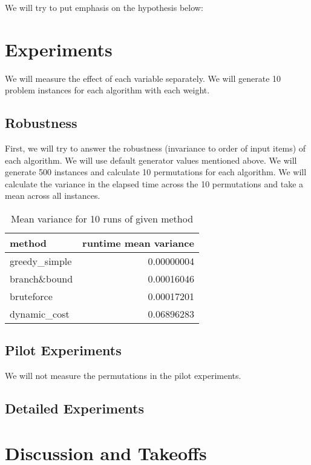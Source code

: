 \documentclass[a4paper,10pt]{article}
\begin{document}
We will try to put emphasis on the hypothesis below:

\section{Experiments}
We will measure the effect of each variable separately. We will generate 10 problem instances for each algorithm with each weight.

\subsection{Robustness}
First, we will try to answer the robustness (invariance to order of input items) of each algorithm. We will use default generator values mentioned above. We will generate 500 instances and calculate 10 permutations for each algorithm. We will calculate the variance in the elapsed time across the 10 permutations and take a mean across all instances.

\begin{table}[!htb]
\centering
\begin{tabular}{lr}
method             & runtime mean variance \\
\midrule
greedy\_simple             & 0.00000004 \\
branch\&bound & 0.00016046 \\
bruteforce & 0.00017201 \\
dynamic\_cost  & 0.06896283 \\
\bottomrule
\end{tabular}
\caption{Mean variance for 10 runs of given method}
\end{table}

\subsection{Pilot Experiments}

 We will not measure the permutations in the pilot experiments.


\subsection{Detailed Experiments}


\section{Discussion and Takeoffs}
\end{document}
